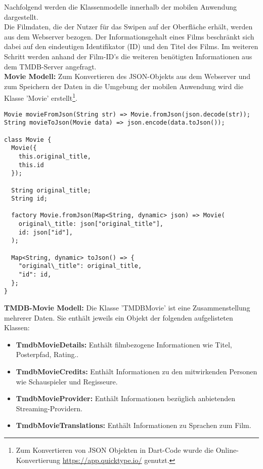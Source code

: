 Nachfolgend werden die Klassenmodelle innerhalb der mobilen Anwendung dargestellt.\\
\noindent
Die Filmdaten, die der Nutzer für das Swipen auf der Oberfläche erhält, werden aus dem Webserver bezogen. Der Informationsgehalt eines Films beschränkt sich dabei auf den eindeutigen Identifikator (ID) und den Titel des Films.
Im weiteren Schritt werden anhand der Film-ID's die weiteren benötigten Informationen aus dem TMDB-Server angefragt. \\

\noindent
\textbf{Movie Modell:}
Zum Konvertieren des JSON-Objekts aus dem Webserver und zum Speichern der Daten in die Umgebung der mobilen Anwendung wird die Klasse 'Movie' erstellt\footnote{Zum Konvertieren von JSON Objekten in Dart-Code wurde die Online-Konvertierung \url{https://app.quicktype.io/} genutzt.}. 


\begin{lstlisting}[caption=Movie Modell - JSON Konvertierung, label=lst:moviemodel]
Movie movieFromJson(String str) => Movie.fromJson(json.decode(str));
String movieToJson(Movie data) => json.encode(data.toJson());

class Movie {
  Movie({
    this.original_title,
    this.id
  });

  String original_title;
  String id;

  factory Movie.fromJson(Map<String, dynamic> json) => Movie(
    original\_title: json["original_title"],
    id: json["id"],
  );

  Map<String, dynamic> toJson() => {
    "original\_title": original_title,
    "id": id,
  };
}
\end{lstlisting}

\noindent
\textbf{TMDB-Movie Modell:}
Die Klasse 'TMDBMovie' ist eine Zusammenstellung mehrerer Daten. Sie enthält jeweils ein Objekt der folgenden aufgelisteten Klassen:

\begin{itemize}
\item \textbf{TmdbMovieDetails:} Enthält filmbezogene Informationen wie Titel, Posterpfad, Rating..
\item \textbf{TmdbMovieCredits:} Enthält Informationen zu den mitwirkenden Personen wie Schauspieler und Regisseure.
\item \textbf{TmdbMovieProvider:} Enthält Informationen bezüglich anbietenden Streaming-Providern.
\item \textbf{TmdbMovieTranslations:} Enthält Informationen zu Sprachen zum Film.
\end{itemize}

